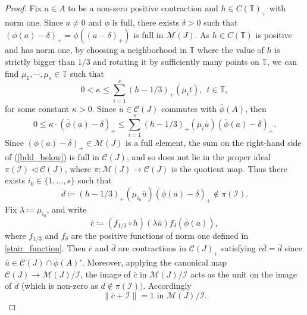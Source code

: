 \documentclass[reqno]{amsart}
\theoremstyle{definition}
\theoremstyle{remark}
\numberwithin{equation}{section}
\theoremstyle{definition}
\newcommand{\calC}{\mathcal{C}}
\newcommand{\calM}{\mathcal{M}}
\newcommand{\calI}{\mathcal{I}}
\begin{document}
\begin{proof} 
Fix $a\in A$ to be a non-zero positive contraction and $h\in C(\mathbb T)_+$ with norm one. Since $a\neq 0$ and $\phi$ is full, there exists $\delta>0$ such that $(\phi(a) - \delta)_{+} = \phi((a-\delta)_{+})$ is full in $\calM(J)$. As $h\in C(\mathbb{T})$ is positive and has norm one, by choosing a neighborhood in $\mathbb{T}$ where the value of $h$ is strictly bigger than $1/3$ and rotating it by sufficiently many points on $\mathbb{T}$, we can find $\mu_{1}, \cdots, \mu_{s}\in \mathbb{T}$ such that 
\begin{equation} 
0 < \kappa \leq \sum_{i=1}^{s} (h-1/3)_{+}(\mu_{i} t), \ \ t\in \mathbb{T}, 
\end{equation}  
for some constant $\kappa>0$. Since ${\overline{u}}\in \calC(J)$ commutes with $\overline{\phi}(A)$, then 
\begin{equation} 
\label{bdd_below} 
0 \leq \kappa \cdot (\overline{\phi} (a) - \delta)_{+} \leq \sum_{i=1}^{s} (h-1/3)_{+}(\mu_{i} \overline{u}) (\overline{\phi} (a) - \delta)_{+}. 
\end{equation} 
Since $(\phi(a) - \delta)_{+}\in \calM(J)$ is a full element, the sum on the right-hand side of (\ref{bdd_below}) is full in $\calC(J)$, and so does not lie in the proper ideal $\pi (\calI)\lhd \mathcal C(J)$, where $\pi: \calM(J)\rightarrow \calC(J)$ is the quotient map. Thus there exists $i_{0}\in \{1, \dots, s\}$ such that 
\begin{equation} 
\overline{d} \coloneqq (h-1/3)_{+}(\mu_{i_{0}} \overline{u}) (\overline{\phi} (a) - \delta)_{+}\notin \pi (\calI). 
\end{equation} 
Fix $\lambda\coloneqq \mu_{i_0}$, and write 
\begin{equation}
\overline{c} \coloneqq (f_{1/3}\circ h)(\lambda \overline{u})f_\delta(\overline{\phi}(a)), 
\end{equation} 
where $f_{1/3}$ and $f_{\delta}$ are the positive functions of norm one defined in \eqref{stair_function}. Then $\overline{c}$ and $\overline{d}$ are contractions in $\calC(J)_{+}$ satisfying $\overline{c}\overline{d}=\overline{d}$ since $\overline{u}\in \calC(J)\cap \overline{\phi}(A)'$. Moreover, applying the canonical map $\mathcal C(J)\to\mathcal M(J)/\mathcal I$, the image of $\overline{c}$ in $\mathcal M(J)/\mathcal I$ acts as the unit on the image of $\overline{d}$ (which is non-zero as $\overline{d}\notin\pi(\mathcal I))$.  Accordingly 
\begin{equation}
\label{induction.normcontrol}
\|\overline{c}+\mathcal I\|=1\text{ in }\mathcal M(J)/\mathcal I.
\end{equation} 


\end{proof}
\end{document}

